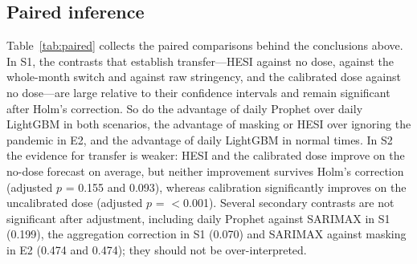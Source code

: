 \documentclass{article}
\theoremstyle{plain}
\theoremstyle{definition}
\theoremstyle{remark}
\begin{document}
\subsection{Paired inference}
Table~\ref{tab:paired} collects the paired comparisons behind the conclusions above. In S1, the contrasts that establish transfer---HESI against no dose, against the whole-month switch and against raw stringency, and the calibrated dose against no dose---are large relative to their confidence intervals and remain significant after Holm's correction. So do the advantage of daily Prophet over daily LightGBM in both scenarios, the advantage of masking or HESI over ignoring the pandemic in E2, and the advantage of daily LightGBM in normal times. In S2 the evidence for transfer is weaker: HESI and the calibrated dose improve on the no-dose forecast on average, but neither improvement survives Holm's correction (adjusted $p$ = 0.155 and 0.093), whereas calibration significantly improves on the uncalibrated dose (adjusted $p$ = $<$0.001). Several secondary contrasts are not significant after adjustment, including daily Prophet against SARIMAX in S1 (0.199), the aggregation correction in S1 (0.070) and SARIMAX against masking in E2 (0.474 and 0.474); they should not be over-interpreted.
\end{document}
